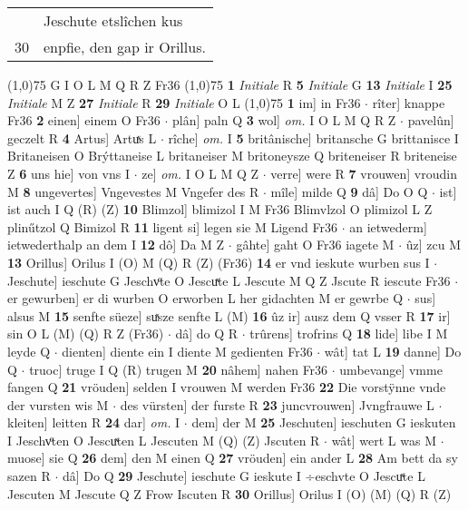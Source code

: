 \documentclass[8pt,a4paper,notitlepage]{article}
\begin{document}
\begin{table}[ht]
\begin{minipage}[t]{0.5\linewidth}
\begin{tabular}{rl}
 & Jeschute etslîchen kus\\ 
30 & enpfie, den gap ir Orillus.\\ 
\end{tabular}
\scriptsize
\line(1,0){75} \newline
G I O L M Q R Z Fr36 \newline
\line(1,0){75} \newline
\textbf{1} \textit{Initiale} R  \textbf{5} \textit{Initiale} G  \textbf{13} \textit{Initiale} I  \textbf{25} \textit{Initiale} M Z  \textbf{27} \textit{Initiale} R  \textbf{29} \textit{Initiale} O L  \newline
\line(1,0){75} \newline
\textbf{1} im] in Fr36  $\cdot$ rîter] knappe Fr36 \textbf{2} einen] einem O Fr36  $\cdot$ plân] paln Q \textbf{3} wol] \textit{om.} I O L M Q R Z  $\cdot$ pavelûn] geczelt R \textbf{4} Artus] Artuͯs L  $\cdot$ rîche] \textit{om.} I \textbf{5} britânische] britansche G brittanisce I Britaneisen O Brýttaneise L britaneiser M britoneysze Q briteneiser R briteneise Z \textbf{6} uns hie] von vns I  $\cdot$ ze] \textit{om.} I O L M Q Z  $\cdot$ verre] were R \textbf{7} vrouwen] vroudin M \textbf{8} ungevertes] Vngevestes M Vngefer des R  $\cdot$ mîle] milde Q \textbf{9} dâ] Do O Q  $\cdot$ ist] ist auch I Q (R) (Z) \textbf{10} Blimzol] blimizol I M Fr36 Blimvlzol O plimizol L Z plinűtzol Q Bimizol R \textbf{11} ligent si] legen sie M Ligend Fr36  $\cdot$ an ietwederm] ietwederthalp an dem I \textbf{12} dô] Da M Z  $\cdot$ gâhte] gaht O Fr36 iagete M  $\cdot$ ûz] zcu M \textbf{13} Orillus] Orilus I (O) M (Q) R (Z) (Fr36) \textbf{14} er vnd ieskute wurben sus I  $\cdot$ Jeschute] ieschute G Jeschvͦte O Jescuͯte L Jescute M Q Z Jscute R iescute Fr36  $\cdot$ er gewurben] er di wurben O erworben L her gidachten M er gewrbe Q  $\cdot$ sus] alsus M \textbf{15} senfte süeze] suͯsze senfte L (M) \textbf{16} ûz ir] ausz dem Q vsser R \textbf{17} ir] sin O L (M) (Q) R Z (Fr36)  $\cdot$ dâ] do Q R  $\cdot$ trûrens] trofrins Q \textbf{18} lide] libe I M leyde Q  $\cdot$ dienten] diente ein I diente M gedienten Fr36  $\cdot$ wât] tat L \textbf{19} danne] Do Q  $\cdot$ truoc] truge I Q (R) trugen M \textbf{20} nâhem] nahen Fr36  $\cdot$ umbevange] vmme fangen Q \textbf{21} vröuden] selden I vrouwen M werden Fr36 \textbf{22} Die vorstÿnne vnde der vursten wis M  $\cdot$ des vürsten] der furste R \textbf{23} juncvrouwen] Jvngfrauwe L  $\cdot$ kleiten] leitten R \textbf{24} dar] \textit{om.} I  $\cdot$ dem] der M \textbf{25} Jeschuten] ieschuten G ieskuten I Jeschvͦten O Jescuͯten L Jescuten M (Q) (Z) Jscuten R  $\cdot$ wât] wert L was M  $\cdot$ muose] sie Q \textbf{26} dem] den M einen Q \textbf{27} vröuden] ein ander L \textbf{28} Am bett da sy sazen R  $\cdot$ dâ] Do Q \textbf{29} Jeschute] ieschute G ieskute I ÷eschvte O Jescuͯte L Jescuten M Jescute Q Z Frow Iscuten R \textbf{30} Orillus] Orilus I (O) (M) (Q) R (Z) \newline

\end{minipage}
\end{table}
\end{document}
